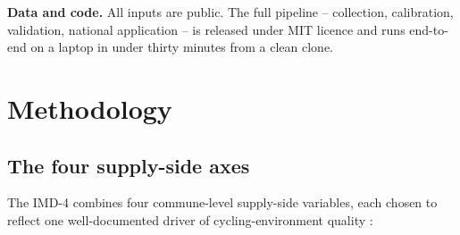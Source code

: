 \documentclass[11pt,a4paper]{article}
\begin{document}
\noindent\textbf{Data and code.}  All inputs are public.  The full
pipeline -- collection, calibration, validation, national application
-- is released under MIT licence and runs end-to-end on a laptop in
under thirty minutes from a clean clone.

\section{Methodology}
\label{sec:methods}

\subsection{The four supply-side axes}

The IMD-4 combines four commune-level supply-side variables, each
chosen to reflect one well-documented driver of cycling-environment
quality :
\end{document}
